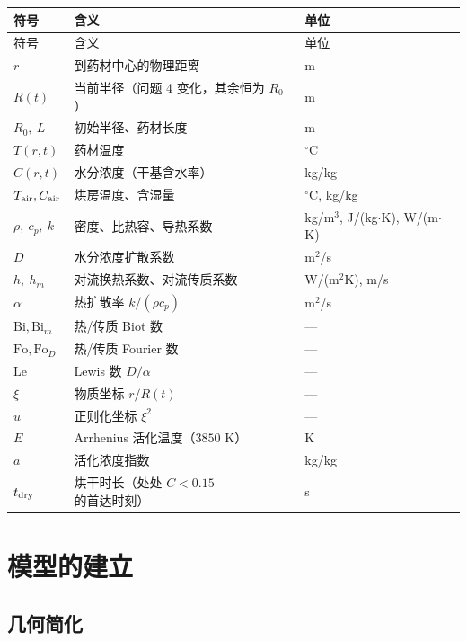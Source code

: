 \documentclass[withoutpreface,bwprint]{cumcmthesis}
\begin{document}
\begin{center}
\small
\begin{longtable}{@{}p{2.5cm}p{8.4cm}p{3.5cm}@{}}
\toprule
符号 & 含义 & 单位 \\
\midrule
\endfirsthead
\toprule
符号 & 含义 & 单位 \\
\midrule
\endhead
$r$ & 到药材中心的物理距离 & m \\
$R(t)$ & 当前半径（问题 4 变化，其余恒为 $R_0$） & m \\
$R_0,\ L$ & 初始半径、药材长度 & m \\
$T(r,t)$ & 药材温度 & $^\circ$C \\
$C(r,t)$ & 水分浓度（干基含水率） & kg/kg \\
$T_{\rm air},C_{\rm air}$ & 烘房温度、含湿量 & $^\circ$C, kg/kg \\
$\rho,\ c_p,\ k$ & 密度、比热容、导热系数 & kg/m$^3$, J/(kg$\cdot$K), W/(m$\cdot$K) \\
$D$ & 水分浓度扩散系数 & m$^2$/s \\
$h,\ h_m$ & 对流换热系数、对流传质系数 & W/(m$^2$K), m/s \\
$\alpha$ & 热扩散率 $k/(\rho c_p)$ & m$^2$/s \\
$\mathrm{Bi},\mathrm{Bi}_m$ & 热/传质 Biot 数 & --- \\
$\mathrm{Fo},\mathrm{Fo}_D$ & 热/传质 Fourier 数 & --- \\
$\mathrm{Le}$ & Lewis 数 $D/\alpha$ & --- \\
$\xi$ & 物质坐标 $r/R(t)$ & --- \\
$u$ & 正则化坐标 $\xi^2$ & --- \\
$E$ & Arrhenius 活化温度（$3850$ K） & K \\
$a$ & 活化浓度指数 & kg/kg \\
$t_{\rm dry}$ & 烘干时长（处处 $C<0.15$ 的首达时刻） & s \\
\bottomrule
\end{longtable}
\end{center}

\section{模型的建立}

\subsection{几何简化}
\end{document}
